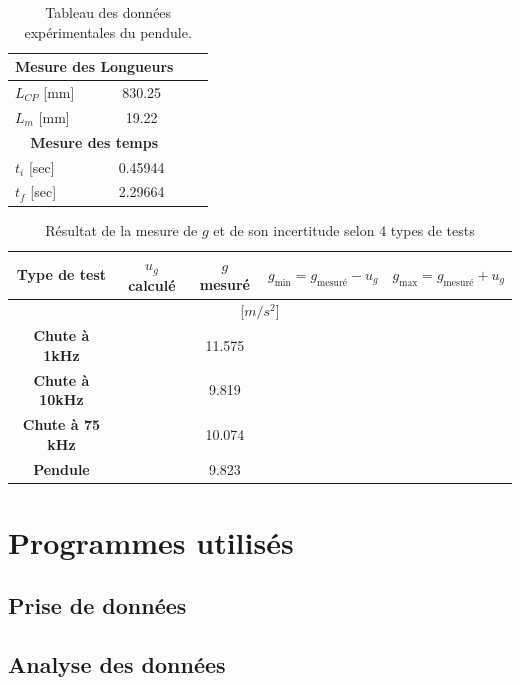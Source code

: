 \documentclass[11pt,twoside]{article}
\numberwithin{figure}{section}
\begin{document}
\begin{table}[h]
\centering
\caption{Tableau des données expérimentales du pendule.}
\label{tab:donnees_pendule}
\begin{tabular}{@{}lccc@{}}
\toprule
\multicolumn{2}{c}{\textbf{Mesure des Longueurs}} \\ \midrule
$L_{CP}$ [mm] & 830.25 \\
$L_{m}$ [mm] & 19.22 \\
\multicolumn{2}{c}{\textbf{Mesure des temps}} \\ \midrule
$t_i$ [sec] & 0.45944 \\
$t_f$ [sec] & 2.29664 \\
\bottomrule
\end{tabular}
\end{table}

\begin{table}[H]
    \centering
    \caption{Résultat de la mesure de $g$ et de son incertitude selon 4 types de tests}
    \label{tab:g_incertitude}
    \begin{tabular}{|c|c|c|c|c|}
        \hline
        Type de test & $u_g$ calculé & $g$ mesuré & $g_{\min} = g_{\text{mesuré}} - u_{g}$ & $g_{\max} = g_{\text{mesuré}} + u_{g}$\\
        \hline
        \multicolumn{5}{|c|}{[$m/s^{2}$]} \\
        \hline
        \textbf{Chute à 1kHz} & & 11.575 & &  \\
        \hline
        \textbf{Chute à 10kHz} & & 9.819 & & \\
        \hline
        \textbf{Chute à 75 kHz} & & 10.074 & & \\
        \hline
        \textbf{Pendule}& & 9.823 & & \\
        \hline
    \end{tabular}
\end{table}
\newpage
\section{Programmes utilisés}
\thispagestyle{empty}

\subsection{Prise de données}
\subsection{Analyse des données}
\end{document}
